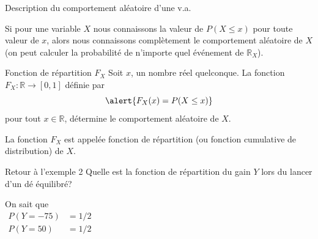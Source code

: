 \documentclass[handout]{BeamerTemplate}
\begin{document}
\begin{frame}[t]{Description du comportement aléatoire d'une v.a.}

Si pour une variable $X$ nous connaissons la valeur de
$P(X\le x)$ %
pour toute valeur de $x$, alors nous connaissons
complètement le comportement aléatoire de $X$
(on peut calculer la probabilité de n'importe quel
événement de $\mathbb{R}_X$).

\begin{Boite}{Fonction de répartition $F_X$}
Soit $x$, un nombre réel quelconque. La fonction $F_X:\mathbb{R}\to[0,1]$ définie par
$$\alert{F_X(x)=P(X\le x)}$$%
pour tout $x\in\mathbb{R}$, détermine le comportement aléatoire de $X$.

\medskip
La fonction $F_X$  est appelée \alert{fonction de répartition} (ou  \alert{fonction cumulative de distribution}) de $X$.
\end{Boite}
\end{frame}

\begin{frame}[t]{Retour à l'exemple 2}
Quelle est la fonction de répartition du gain $Y$ lors du lancer d'un dé équilibré?%

On sait que\\
$\begin{array}{ll}P(Y=-75)&=1/2\\
P(Y=50)&=1/2\end{array}$

\end{frame}
\end{document}
